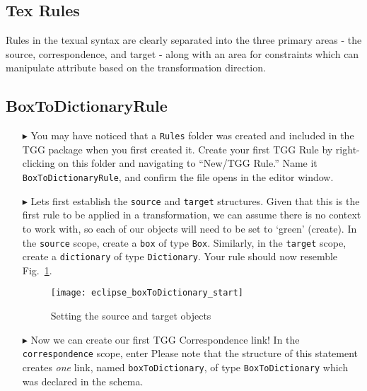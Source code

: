 \newpage
\hypertarget{rules tex}{}
\subsection{Tex Rules}
\texHeader

Rules in the texual syntax are clearly separated into the three primary areas - the source, correspondence, and target - along with an area for constraints
which can manipulate attribute based on the transformation direction.

\subsection{BoxToDictionaryRule}

\begin{itemize}

\item[$\blacktriangleright$] You may have noticed that a \texttt{Rules} folder was created and included in the TGG package when you first created it. Create
your first TGG Rule by right-clicking on this folder and navigating to ``New/TGG Rule.'' Name it \texttt{BoxToDictionaryRule}, and confirm the file opens in the
editor window.

\item[$\blacktriangleright$] Lets first establish the \texttt{source} and \texttt{target}  structures. Given that this is the first rule to be applied in a
transformation, we can assume there is no context to work with, so each of our objects will need to be set to `green' (create). In the \texttt{source} scope,
create a \texttt{box} of type \texttt{Box}. Similarly, in the \texttt{target} scope, create a \texttt{dictionary} of type \texttt{Dictionary}. Your rule
should now resemble Fig.~\ref{eclipse:textSourceRule}.

\vspace{0.5cm}

\begin{figure}[htbp]
\begin{center}
  \texttt{[image: eclipse\_boxToDictionary\_start]}
  \caption{Setting the source and target objects}
  \label{eclipse:textSourceRule}
\end{center}
\end{figure}

\item[$\blacktriangleright$] Now we can create our first TGG Correspondence link! In the \texttt{correspondence} scope, enter 
Please note that the structure of this statement creates \emph{one} link, named \texttt{boxToDictionary}, of type \texttt{BoxToDictionary} which
was declared in the schema.

\end{itemize}

